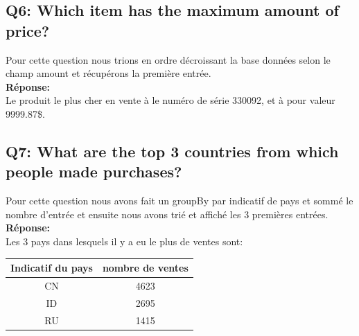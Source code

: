 \documentclass[11pt]{article}
\begin{document}
\subsection*{Q6: Which item has the maximum amount of price?}
	Pour cette question nous trions en ordre décroissant la base données
	selon le champ amount et récupérons la première entrée.\\
	\textbf{Réponse:\\}
	Le produit le plus cher en vente à le numéro de série 330092, et à pour
	valeur 9999.87\$.
\subsection*{Q7: What are the top 3 countries from which people made purchases?}
	Pour cette question nous avons fait un groupBy par indicatif de pays
	et sommé le nombre d'entrée et ensuite nous avons trié et affiché
	les 3 premières entrées.\\
	\textbf{Réponse:\\}
	Les 3 pays dans lesquels il y a eu le plus de ventes sont:
	\begin{center}
	\begin{tabular}{|c|c|}
		\hline
		Indicatif du pays & nombre de ventes \\
		\hline
		CN & 4623 \\
		\hline
		ID & 2695 \\
		\hline
		RU & 1415 \\
		\hline
	\end{tabular}
	\end{center}
\end{document}
